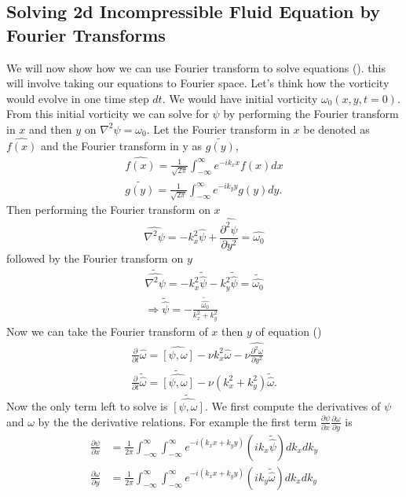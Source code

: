 \documentclass{article}
\begin{document}
\subsection{Solving 2d Incompressible Fluid Equation by Fourier Transforms}
We will now show how we can use Fourier transform to solve equations (). this will involve taking our equations to Fourier space. Let's think how the vorticity would evolve in one time step $dt$. We would have initial vorticity $\omega_0(x,y,t=0)$. From this initial vorticity we can solve for $\psi$ by performing the Fourier transform in $x$ and then $y$ on $\nabla^2\psi = \omega_0$. Let the Fourier transform in $x$ be denoted as $\widehat{f(x)}$ and the Fourier transform in y as $\widetilde{g(y)}$,
\begin{align*}
\widehat{f(x)} = \frac{1}{\sqrt{2\pi}}\int_{-\infty}^{\infty}e^{-ik_x x}f(x)dx\\
\widetilde{g(y)} = \frac{1}{\sqrt{2\pi}}\int_{-\infty}^{\infty}e^{-ik_y y}g(y)dy.
\end{align*}
Then performing the Fourier transform on $x$
\begin{equation*}
\widehat{\nabla^2\psi} = -k_x^2\widehat{\psi} + \widehat{\frac{\partial^2 \psi}{\partial y^2}} = \widehat{\omega_0}
\end{equation*}
followed by the Fourier transform on $y$
\begin{gather*}
\widetilde{\widehat{\nabla^2\psi}} = -k_x^2\widetilde{\widehat{\psi}} - k_y^2\widetilde{\widehat{\psi}} = \widetilde{\widehat{\omega_0}}\\
\Rightarrow \widetilde{\widehat{\psi}} = -\frac{\widetilde{\widehat{\omega_0}}}{k_x^2 + k_y^2}
\end{gather*}
Now we can take the Fourier transform of $x$ then $y$ of equation ()
\begin{gather*}
\frac{\partial}{\partial t} \widehat{\omega} = \widehat{\left[\psi,\omega\right]}  - \nu k_x^2\widehat{\omega} -  \nu\widehat{\frac{\partial^2 \omega}{\partial y^2}}\\
\frac{\partial}{\partial t} \widetilde{\widehat{\omega}} = \widetilde{\widehat{\left[\psi,\omega\right]}}  - \nu (k_x^2 + k_y^2) \widetilde{\widehat{\omega}}.
\end{gather*}
Now the only term left to solve is $\widetilde{\widehat{\left[\psi,\omega\right]}}$. We first compute the derivatives of $\psi$ and $\omega$ by the the derivative relations. For example the first term $\frac{\partial\psi}{\partial x}\frac{\partial \omega}{\partial y}$ is
\begin{align*}
\frac{\partial \psi}{\partial x} &= \frac{1}{2\pi}\int_{-\infty}^{\infty}\int_{-\infty}^{\infty}e^{-i(k_x x+k_y y)}(ik_x\widetilde{\widehat{\psi}}) dk_x dk_y\\
\frac{\partial \omega}{\partial y} &= \frac{1}{2\pi}\int_{-\infty}^{\infty}\int_{-\infty}^{\infty}e^{-i(k_x x+k_y y)}(ik_y\widetilde{\widehat{\omega}}) dk_x dk_y
\end{align*}
\end{document}
